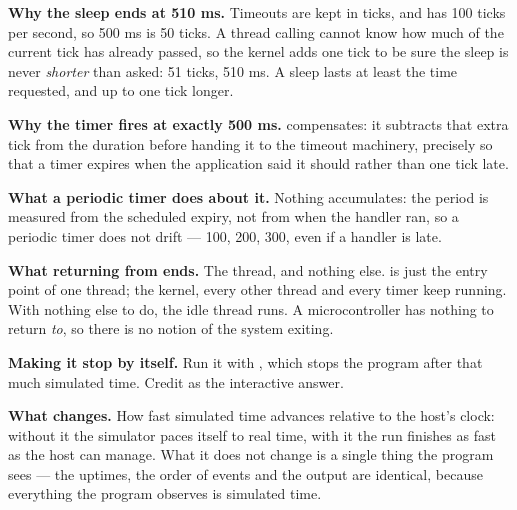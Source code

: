 \textbf{Why the sleep ends at 510 ms.} Timeouts are kept in ticks, and  has 100
ticks per second, so 500 ms is 50 ticks. A thread calling  cannot know how much of
the current tick has already passed, so the kernel adds one tick to be sure the sleep is never
\emph{shorter} than asked: 51 ticks, 510 ms. A sleep lasts at least the time requested, and up to
one tick longer. 

\textbf{Why the timer fires at exactly 500 ms.}  compensates: it subtracts
that extra tick from the duration before handing it to the timeout machinery, precisely so that a
timer expires when the application said it should rather than one tick late. 

\textbf{What a periodic timer does about it.} Nothing accumulates: the period is measured from the
scheduled expiry, not from when the handler ran, so a periodic timer does not drift --- 100, 200,
300, even if a handler is late. 

\textbf{What returning from  ends.} The  thread, and nothing else.
 is just the entry point of one thread; the kernel, every other thread and every timer
keep running. With nothing else to do, the idle thread runs. A microcontroller has nothing to return
\emph{to}, so there is no notion of the system exiting. 

\textbf{Making it stop by itself.} Run it with , which stops the program
after that much simulated time. Credit  as the interactive answer. 

\textbf{What  changes.} How fast simulated time advances relative to the host's clock:
without it the simulator paces itself to real time, with it the run finishes as fast as the host can
manage. What it does not change is a single thing the program sees --- the uptimes, the order of
events and the output are identical, because everything the program observes is simulated time.


